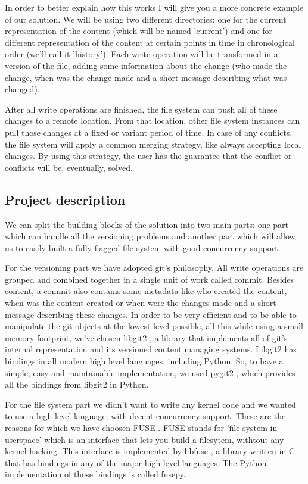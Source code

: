 In order to better explain how this works I will give you a more concrete example of our solution. We will be using two different directories: one for the current representation of the content (which will be named 'current') and one for different representation of the content at certain points in time in chronological order (we'll call it 'history'). Each write operation will be transformed in a version of the file, adding some information about the change (who made the change, when was the change made and a short message describing what was changed).

After all write operations are finished, the file system can push all of these changes to a remote location. From that location, other file system instances can pull those changes at a fixed or variant period of time. In case of any conflicts, the file system will apply a common merging strategy, like always accepting local changes. By using this strategy, the user has the guarantee that the conflict or conflicts will be, eventually, solved.

\subsection{Project description}
We can split the building blocks of the solution into two main parts: one part which can handle all the versioning problems and another part which will allow us to easily built a fully flagged file system with good concurrency support.

For the versioning part we have adopted git's philosophy. All write operations are grouped and combined together in a single unit of work called commit. Besides content, a commit also contains some metadata like who created the content, when was the content created or when were the changes made and a short message describing these changes. In order to be very efficient and to be able to manipulate the git objects at the lowest level possible, all this while using a small memory footprint, we've chosen libgit2 \cite{Libgit2016}, a library that implements all of git's internal representation and its versioned content managing systems. Libgit2 has bindings in all modern high level languages, including Python. So, to have a simple, easy and maintainable implementation, we used pygit2 \cite{Pygit2016}, which provides all the bindings from libgit2 in Python.

For the file system part we didn't want to write any kernel code and we wanted to use a high level language, with decent concurrency support. These are the reasons for which we have choosen FUSE \cite{Rajgarhia2010}. FUSE stands for 'file system in userspace' which is an interface that lets you build a filesytem, withtout any kernel hacking. This interface is implemented by libfuse \cite{Libfuse2016}, a library written in C that has bindings in any of the major high level languages. The Python implementation of those bindings is called fusepy.

